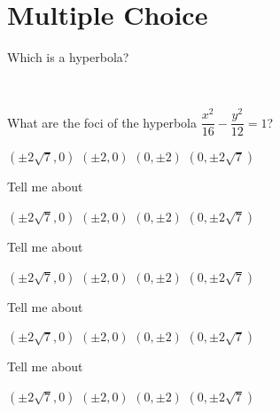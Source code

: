 \documentclass{exam}
\begin{document}
\section*{Multiple Choice}
\begin{questions}
\question Which is a hyperbola?

\begin{oneparchoices}
	\choice {}
	\choice {}
	\\
	\choice {}
	\choice {}
\end{oneparchoices} \answerline

\question What are the foci of the hyperbola $\dfrac{x^2}{16}-\dfrac{y^2}{12} = 1$?

\begin{oneparchoices}
	\choice $(\pm 2\sqrt7,0)$
	\choice $(\pm 2,0)$
	\choice $(0, \pm 2)$
	\choice $(0, \pm 2\sqrt7)$
\end{oneparchoices} \answerline

\question  Tell me about 

\begin{oneparchoices}
	\choice $(\pm 2\sqrt7,0)$
	\choice $(\pm 2,0)$
	\choice $(0, \pm 2)$
	\choice $(0, \pm 2\sqrt7)$
\end{oneparchoices} \answerline

\question  Tell me about 

\begin{oneparchoices}
	\choice $(\pm 2\sqrt7,0)$
	\choice $(\pm 2,0)$
	\choice $(0, \pm 2)$
	\choice $(0, \pm 2\sqrt7)$
\end{oneparchoices} \answerline

\question Tell me about 

\begin{oneparchoices}
	\choice $(\pm 2\sqrt7,0)$
	\choice $(\pm 2,0)$
	\choice $(0, \pm 2)$
	\choice $(0, \pm 2\sqrt7)$
\end{oneparchoices} \answerline

\question  Tell me about 

\begin{oneparchoices}
	\choice $(\pm 2\sqrt7,0)$
	\choice $(\pm 2,0)$
	\choice $(0, \pm 2)$
	\choice $(0, \pm 2\sqrt7)$
\end{oneparchoices} \answerline
\end{questions}
\end{document}

